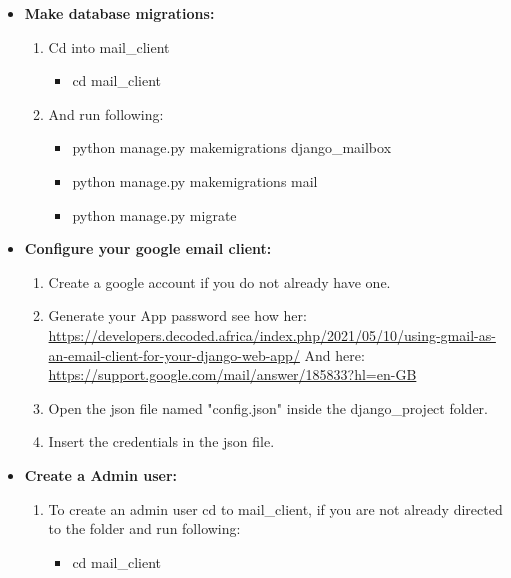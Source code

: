 \documentclass{article}
\begin{document}
\begin{itemize}
\begin{enumerate}
    \end{enumerate}
    
    \item \textbf{Make database migrations: } 
    \begin{enumerate}
        \item Cd into mail\_client
        
        \begin{itemize}
        \item cd mail\_client
        \end{itemize}
        
        \item And run following:
        
        \begin{itemize}
        \item python manage.py makemigrations django\_mailbox 
        \item python manage.py makemigrations mail
        \item python manage.py migrate
        \end{itemize}

    \end{enumerate}
    \item \textbf{Configure your google email client: } 
    \begin{enumerate}
        \item Create a google account if you do not already have one.
        \item Generate your App password see how her: \url{https://developers.decoded.africa/index.php/2021/05/10/using-gmail-as-an-email-client-for-your-django-web-app/}
        And here: \url{https://support.google.com/mail/answer/185833?hl=en-GB}
        
        \item Open the json file named "config.json" inside the django\_project folder.
        \item Insert the credentials in the json file.

    \end{enumerate}
    \item \textbf{Create a Admin user: } 
    \begin{enumerate}
        \item To create an admin user cd to mail\_client, if you are not already directed to the folder
        and run following:
        
        \begin{itemize}
        \item cd mail\_client
        

\end{itemize}
\end{enumerate}
\end{itemize}
\end{document}
